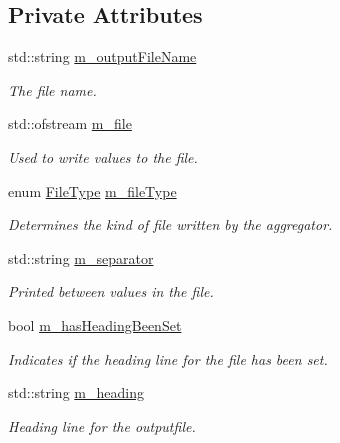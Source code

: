 \subsection*{Private Attributes}
\begin{DoxyCompactItemize}
\item 
std\+::string \hyperlink{classns3_1_1FileAggregator_ad3840bfc503a61e0020746fdc88d7be3}{m\+\_\+output\+File\+Name}
\begin{DoxyCompactList}\small\item\em The file name. \end{DoxyCompactList}\item 
std\+::ofstream \hyperlink{classns3_1_1FileAggregator_a756affa0d614724be513ceedcff62ac0}{m\+\_\+file}
\begin{DoxyCompactList}\small\item\em Used to write values to the file. \end{DoxyCompactList}\item 
enum \hyperlink{classns3_1_1FileAggregator_aedb3108205a498f7ac0c564508067e2d}{File\+Type} \hyperlink{classns3_1_1FileAggregator_aa2a8abfe3082a802dc6705e701f73e9e}{m\+\_\+file\+Type}
\begin{DoxyCompactList}\small\item\em Determines the kind of file written by the aggregator. \end{DoxyCompactList}\item 
std\+::string \hyperlink{classns3_1_1FileAggregator_a1f74a4c07f663d535da56dfb70414a15}{m\+\_\+separator}
\begin{DoxyCompactList}\small\item\em Printed between values in the file. \end{DoxyCompactList}\item 
bool \hyperlink{classns3_1_1FileAggregator_a994026e8bd889b7db66789be359f8f42}{m\+\_\+has\+Heading\+Been\+Set}
\begin{DoxyCompactList}\small\item\em Indicates if the heading line for the file has been set. \end{DoxyCompactList}\item 
std\+::string \hyperlink{classns3_1_1FileAggregator_a9ad411aab69509da361a7a54339b7c0f}{m\+\_\+heading}
\begin{DoxyCompactList}\small\item\em Heading line for the outputfile. \end{DoxyCompactList}\item 

\end{DoxyCompactItemize}
